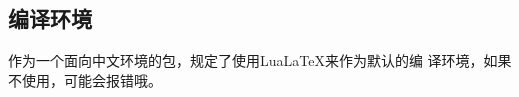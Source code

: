 \documentclass{peterlitsdoc}
\begin{document}

\subsection{编译环境}

作为一个面向中文环境的包，规定了使用LuaLaTeX来作为默认的编
译环境，如果不使用，可能会报错哦。


\end{document}
